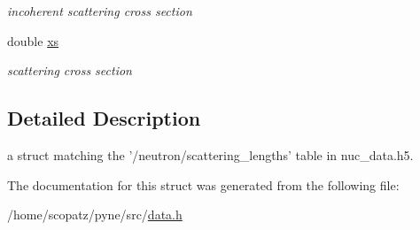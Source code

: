 \begin{DoxyCompactItemize}
\begin{DoxyCompactList}\small\item\em incoherent scattering cross section \end{DoxyCompactList}\item 
\hypertarget{structpyne_1_1scattering__lengths_aaaab6ef13d13f4058b263f0d28da9ac3}{double \hyperlink{structpyne_1_1scattering__lengths_aaaab6ef13d13f4058b263f0d28da9ac3}{xs}}\label{structpyne_1_1scattering__lengths_aaaab6ef13d13f4058b263f0d28da9ac3}

\begin{DoxyCompactList}\small\item\em scattering cross section \end{DoxyCompactList}\end{DoxyCompactItemize}


\subsection{Detailed Description}
a struct matching the '/neutron/scattering\-\_\-lengths' table in nuc\-\_\-data.\-h5. 

The documentation for this struct was generated from the following file\-:\begin{DoxyCompactItemize}
\item 
/home/scopatz/pyne/src/\hyperlink{data_8h}{data.\-h}\end{DoxyCompactItemize}

